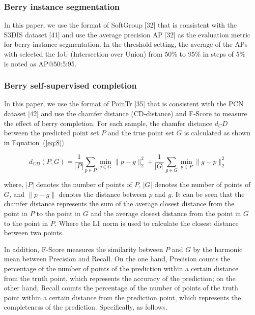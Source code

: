 \documentclass[12pt]{article}
\begin{document}
\subsubsection{Berry instance segmentation}

In this paper, we use the format of SoftGroup [32] that is consistent with the S3DIS dataset [41] and use the average precision AP [32] as the evaluation metric for berry instance segmentation. In the threshold setting, the average of the APs with selected the IoU (Intersection over Union) from 50\% to 95\% in steps of 5\% is noted as AP@50:5:95.

\subsubsection{Berry self-supervised completion}

In this paper, we use the format of PoinTr [35] that is consistent with the PCN dataset [42] and use the chamfer distance (CD-distance) and F-Score to measure the effect of berry completion. 
For each sample, the chamfer distance $d_CD$ between the predicted point set $P$ and the true point set $G$ is calculated as shown in Equation~(\ref{eq:8})

\begin{equation}
    d_{CD}(P, G) = \frac{1}{|P|} \sum_{p \in P} \min_{g \in G} \|p - g\|_2^2 + \frac{1}{|G|} \sum_{g \in G} \min_{p \in P} \|g - p\|_2^2
    \label{eq:8}
\end{equation}

{\raggedright where, $|P|$ denotes the number of points of $P$, $|G|$ denotes the number of points of $G$, and $\|p - g\|$ denotes the distance between $p$ and $g$. 
It can be seen that the chamfer distance represents the sum of the average closest distance from the point in $P$ to the point in $G$ and the average closest distance from the point in $G$ to the point in $P$. Where the L1 norm is used to calculate the closest distance between two points.}

In addition, F-Score measures the similarity between $P$ and $G$ by the harmonic mean between Precision and Recall. 
On the one hand, Precision counts the percentage of the number of points of the prediction within a certain distance from the truth point, which represents the accuracy of the prediction;
on the other hand, Recall counts the percentage of the number of points of the truth point within a certain distance from the prediction point, which represents the completeness of the prediction. Specifically, as follows.
\end{document}
